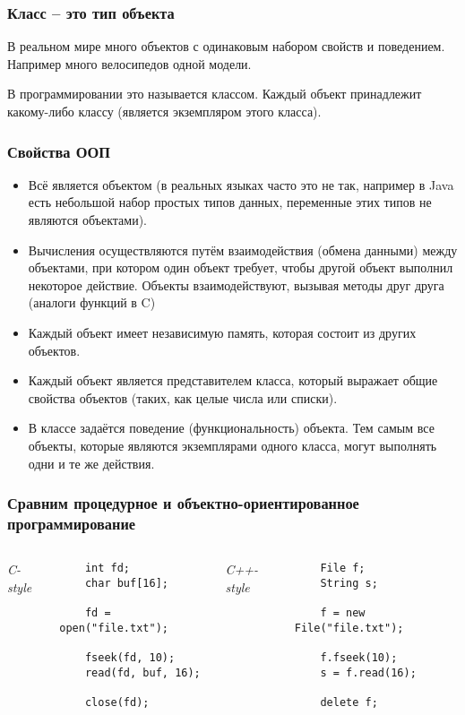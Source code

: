 \begin{frame}
	\frametitle{Класс -- это тип объекта}
	\begin{large}
	В реальном мире много объектов с одинаковым набором свойств и поведением. Например много велосипедов одной модели.

	\medskip
	В программировании это называется классом. Каждый объект принадлежит какому-либо классу (является экземпляром этого класса).
	\end{large}
\end{frame}

\begin{frame}
	\frametitle{Свойства ООП}
	\begin{small}
	\begin{itemize}
		\item{Всё является объектом (в реальных языках часто это не так, например в Java есть небольшой набор простых типов данных, переменные этих типов не являются объектами).}
		\item{Вычисления осуществляются путём взаимодействия (обмена данными) между объектами, при котором один объект требует, чтобы другой объект выполнил некоторое действие. Объекты взаимодействуют, вызывая методы друг друга (аналоги функций в C)}
		\item{Каждый объект имеет независимую память, которая состоит из других объектов.}
		\item{Каждый объект является представителем класса, который выражает общие свойства объектов (таких, как целые числа или списки).}
		\item{В классе задаётся поведение (функциональность) объекта. Тем самым все объекты, которые являются экземплярами одного класса, могут выполнять одни и те же действия.}
	\end{itemize}
	\end{small}
\end{frame}

\begin{frame}[fragile]
	\frametitle{Сравним процедурное и объектно-ориентированное программирование}

	\begin{columns}[c]
	\column{2.1in}
	\emph{C-style}
	\medskip
	\begin{verbatim}
	int fd;
	char buf[16];

	fd = open("file.txt");

	fseek(fd, 10);
	read(fd, buf, 16);

	close(fd);
	\end{verbatim}
	\column{2.1in}
	\emph{C++-style}
	\medskip
	\begin{verbatim}
	File f;
	String s;

	f = new File("file.txt");

	f.fseek(10);
	s = f.read(16);

	delete f;
	\end{verbatim}
	\end{columns}
\end{frame}

